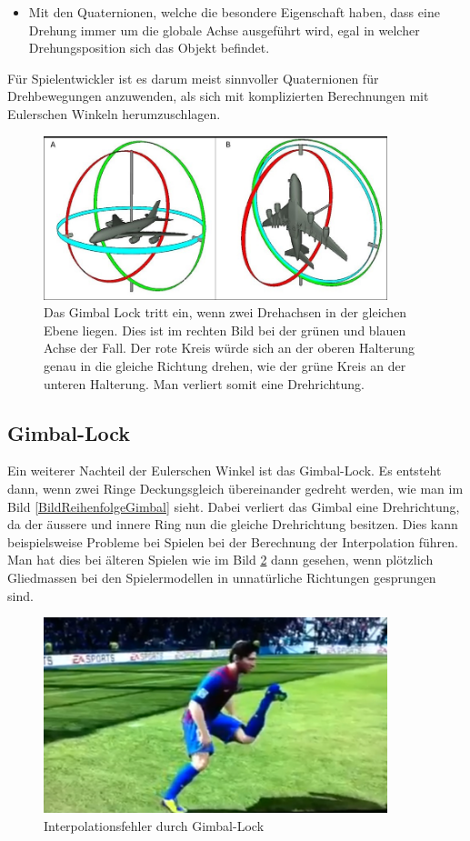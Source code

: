 \begin{itemize}
	\item Mit den Quaternionen, welche die besondere Eigenschaft haben, dass eine Drehung immer um die globale Achse ausgeführt wird, egal in welcher Drehungsposition sich das Objekt befindet.
\end{itemize}
Für Spielentwickler ist es darum meist sinnvoller Quaternionen für Drehbewegungen anzuwenden, als sich mit komplizierten Berechnungen mit Eulerschen Winkeln herumzuschlagen.

\begin{figure}
	\centering
	\includegraphics[width=10cm]{papers/clifford/Bilder/ReihenfolgeGimbal.png}
	\caption{Das Gimbal Lock tritt ein, wenn zwei Drehachsen in der gleichen Ebene liegen. Dies ist im rechten Bild bei der grünen und blauen Achse der Fall. Der rote Kreis würde sich an der oberen Halterung genau in die gleiche Richtung drehen, wie der grüne Kreis an der unteren Halterung. Man verliert somit eine Drehrichtung.}
	\label{BildReihenfolgeGimbal}
\end{figure}

\subsection{Gimbal-Lock}
Ein weiterer Nachteil der Eulerschen Winkel ist das Gimbal-Lock.
Es entsteht dann, wenn zwei Ringe Deckungsgleich übereinander gedreht werden, wie man im Bild \eqref{BildReihenfolgeGimbal} sieht.
Dabei verliert das Gimbal eine Drehrichtung, da der äussere und innere Ring nun die gleiche Drehrichtung besitzen.
Dies kann beispielsweise Probleme bei Spielen bei der Berechnung der Interpolation führen.
Man hat dies bei älteren Spielen wie im Bild \ref{BildGimbalLock} dann gesehen, wenn plötzlich Gliedmassen bei den Spielermodellen in unnatürliche Richtungen gesprungen sind.

\begin{figure}
	\centering
	\includegraphics[width=10cm]{papers/clifford/Bilder/GimbalLock.png}
	\caption{Interpolationsfehler durch Gimbal-Lock}
	\label{BildGimbalLock}
\end{figure}
